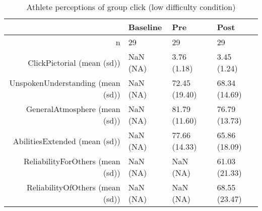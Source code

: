 \begin{table}[ht]
\centering
\begin{tabular}{rlll}
  \hline
 & Baseline & Pre & Post \\ 
  \hline
n &  29 &    29 &    29 \\ 
  ClickPictorial (mean (sd)) & NaN (NA) &  3.76 (1.18) &  3.45 (1.24) \\ 
  UnspokenUnderstanding (mean (sd)) & NaN (NA) & 72.45 (19.40) & 68.34 (14.69) \\ 
  GeneralAtmosphere (mean (sd)) & NaN (NA) & 81.79 (11.60) & 76.79 (13.73) \\ 
  AbilitiesExtended (mean (sd)) & NaN (NA) & 77.66 (14.33) & 65.86 (18.09) \\ 
  ReliabilityForOthers (mean (sd)) & NaN (NA) &   NaN (NA) & 61.03 (21.33) \\ 
  ReliabilityOfOthers (mean (sd)) & NaN (NA) &   NaN (NA) & 68.55 (23.47) \\ 
   \hline
\end{tabular}
\caption{Athlete perceptions of 
 group click (low difficulty condition)} 
\end{table}
